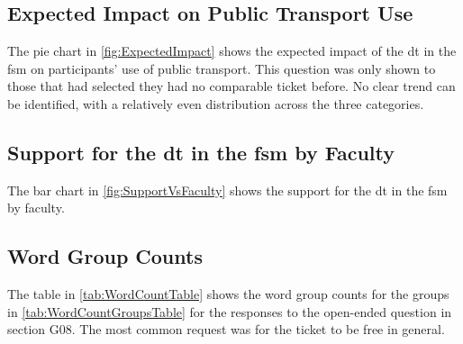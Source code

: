 \subsection{Expected Impact on Public Transport Use}
\begin{multicols}{2}
    
    \columnbreak
    The pie chart in \ref{fig:ExpectedImpact} shows the expected impact of the \gls{dt} in the \gls{fsm} on participants' use of public transport.
    This question was only shown to those that had selected they had no comparable ticket before.
    No clear trend can be identified, with a relatively even distribution across the three categories.
\end{multicols}

\subsection{Support for the \gls{dt} in the \gls{fsm} by Faculty}
\begin{multicols}{2}
    
    \columnbreak
    The bar chart in \ref{fig:SupportVsFaculty} shows the support for the \gls{dt} in the \gls{fsm} by faculty.
\end{multicols}

\pagebreak
\subsection{Word Group Counts}
\begin{multicols}{2}
    
    \columnbreak
    The table in \ref{tab:WordCountTable} shows the word group counts for the groups in \ref{tab:WordCountGroupsTable} for the responses to the open-ended question in section G08.
    The most common request was for the ticket to be free in general.
\end{multicols} 



\pagebreak
